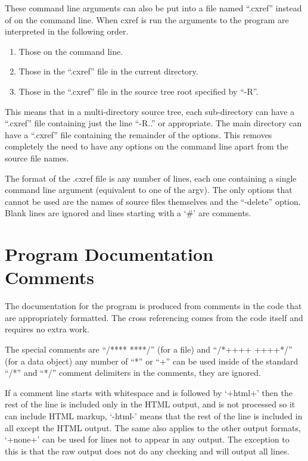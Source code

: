 \documentclass{report}
\begin{document}
These command line arguments can also be put into a file named ``.cxref'' instead of
on the command line.  When cxref is run the arguments to the program are
interpreted in the following order.

\begin{enumerate}
\item Those on the command line.
\item Those in the ``.cxref'' file in the current directory.
\item Those in the ``.cxref'' file in the source tree root specified by ``-R''.
\end{enumerate}

This means that in a multi-directory source tree, each sub-directory can have a
``.cxref'' file containing just the line ``-R..'' or appropriate.  The main
directory can have a ``.cxref'' file containing the remainder of the options.  This
removes completely the need to have any options on the command line apart from
the source file names.

The format of the .cxref file is any number of lines, each one containing a
single command line argument (equivalent to one of the argv).  The only options
that cannot be used are the names of source files themselves and the ``-delete''
option.  Blank lines are ignored and lines starting with a `\#' are comments.

\section{Program Documentation Comments}

The documentation for the program is produced from comments in the code that are
appropriately formatted.  The cross referencing comes from the code itself and
requires no extra work.

The special comments are ``/**** ****/'' (for a file) and ``/*++++ ++++*/'' (for a
data object) any number of ``*'' or ``+'' can be used inside of the standard ``/*''
and ``*/'' comment delimiters in the comments, they are ignored.

If a comment line starts with whitespace and is followed by `+html+' then the
rest of the line is included only in the HTML output, and is not processed so it
can include HTML markup, `-html-' means that the rest of the line is included in
all except the HTML output.  The same also applies to the other output formats,
`+none+' can be used for lines not to appear in any output.  The exception to
this is that the raw output does not do any checking and will output all lines.
\end{document}
